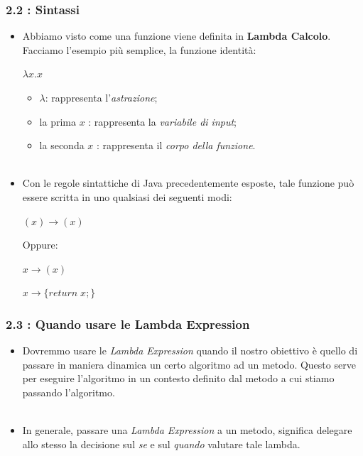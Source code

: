 \documentclass{beamer}
\begin{document}
\begin{frame}
	\frametitle{\textbf{2.2 : Sintassi}}
	\begin{itemize}
		\item
			Abbiamo visto come una funzione viene definita in \textbf{Lambda Calcolo}. Facciamo l'esempio più semplice, la funzione identità:
			\begin{center}
				\Large$\lambda x.x$
			\end{center}
			\begin{itemize}
				\item
					\Large$\lambda$: rappresenta l'\textit{astrazione};
				\item
					la prima \Large $x$ : rappresenta la \textit{variabile di input};
				\item
					la seconda \Large $x$ : rappresenta il  \textit{corpo della funzione}.\\\
			\end{itemize}	
		\item
			Con le regole sintattiche di Java precedentemente esposte, tale funzione pu\`o essere scritta in uno qualsiasi dei seguenti modi:
			\begin{center}
				\Large$(x)\rightarrow(x)$
			\end{center}
			Oppure:
			\begin{center}
				\Large$x\rightarrow(x)$
			\end{center}
		\begin{center}
			\Large$x\rightarrow\{return\;x;\}$
		\end{center}											
	\end{itemize}
\end{frame}


\begin{frame}
	\frametitle{\textbf{2.3 : Quando usare le Lambda Expression}}
	\begin{itemize}
		\item
			Dovremmo usare le \textit{Lambda Expression} quando il nostro obiettivo è quello di passare in maniera dinamica un certo algoritmo ad un metodo. Questo serve per eseguire l'algoritmo in un contesto definito dal metodo a cui stiamo passando l'algoritmo. \\\
		\item
			In generale, passare una \textit{Lambda Expression} a un metodo, significa delegare allo stesso la decisione sul \emph{se} e sul \emph{quando} valutare tale lambda.
	\end{itemize}
\end{frame}
\end{document}
